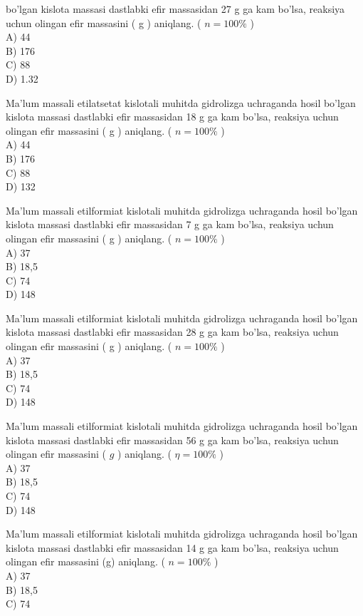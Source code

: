 bo'lgan kislota massasi dastlabki efir massasidan 27 g ga kam bo'lsa, reaksiya uchun olingan efir massasini ( g ) aniqlang. ( $n=100 \%$ )\\
A) 44\\
B) 176\\
C) 88\\
D) 1.32
  \item Ma'lum massali etilatsetat kislotali muhitda gidrolizga uchraganda hosil bo'lgan kislota massasi dastlabki efir massasidan 18 g ga kam bo'lsa, reaksiya uchun olingan efir massasini ( g ) aniqlang. ( $n=100 \%$ )\\
A) 44\\
B) 176\\
C) 88\\
D) 132
  \item Ma'lum massali etilformiat kislotali muhitda gidrolizga uchraganda hosil bo'lgan kislota massasi dastlabki efir massasidan 7 g ga kam bo'lsa, reaksiya uchun olingan efir massasini ( g ) aniqlang. ( $n=100 \%$ )\\
A) 37\\
B) 18,5\\
C) 74\\
D) 148
  \item Ma'lum massali etilformiat kislotali muhitda gidrolizga uchraganda hosil bo'lgan kislota massasi dastlabki efir massasidan 28 g ga kam bo'lsa, reaksiya uchun olingan efir massasini ( g ) aniqlang. ( $n=100 \%$ )\\
A) 37\\
B) 18,5\\
C) 74\\
D) 148
  \item Ma'lum massali etilformiat kislotali muhitda gidrolizga uchraganda hosil bo'lgan kislota massasi dastlabki efir massasidan 56 g ga kam bo'lsa, reaksiya uchun olingan efir massasini ( $g$ ) aniqlang. ( $\eta=100 \%$ )\\
A) 37\\
B) 18,5\\
C) 74\\
D) 148
  \item Ma'lum massali etilformiat kislotali muhitda gidrolizga uchraganda hosil bo'lgan kislota massasi dastlabki efir massasidan 14 g ga kam bo'lsa, reaksiya uchun olingan efir massasini (g) aniqlang. ( $n=100 \%$ )\\
A) 37\\
B) 18,5\\
C) 74\\
